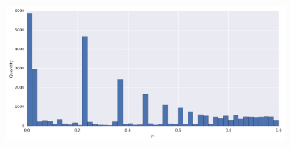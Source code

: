 \begin{figure}[h]
\centering
\begin{subfigure}[t]{\textwidth}
	\includegraphics[width=\textwidth]{figures/bayes/hist_calls.png}
\end{subfigure}


\end{figure}
